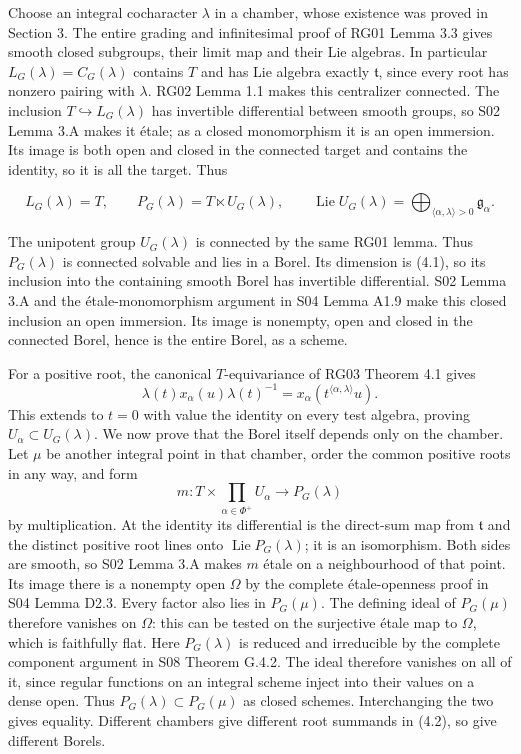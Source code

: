 \documentclass[11pt,a4paper,openany]{report}
\newcounter{none}
\begin{document}
Choose an integral cocharacter \(\lambda\) in a chamber, whose existence was proved in Section 3. The entire grading and infinitesimal proof of RG01 Lemma 3.3 gives smooth closed subgroups, their limit map and their Lie algebras. In particular \(L_G(\lambda)=C_G(\lambda)\) contains \(T\) and has Lie algebra exactly \(\mathfrak t\), since every root has nonzero pairing with \(\lambda\). RG02 Lemma 1.1 makes this centralizer connected. The inclusion \(T\hookrightarrow L_G(\lambda)\) has invertible differential between smooth groups, so S02 Lemma 3.A makes it étale; as a closed monomorphism it is an open immersion. Its image is both open and closed in the connected target and contains the identity, so it is all the target. Thus

\[
L_G(\lambda)=T,\qquad
P_G(\lambda)=T\ltimes U_G(\lambda),\qquad
\operatorname{Lie}U_G(\lambda)
=\bigoplus_{\langle\alpha,\lambda\rangle>0}\mathfrak g_\alpha.
\tag{4.2}
\]

The unipotent group \(U_G(\lambda)\) is connected by the same RG01 lemma. Thus \(P_G(\lambda)\) is connected solvable and lies in a Borel. Its dimension is (4.1), so its inclusion into the containing smooth Borel has invertible differential. S02 Lemma 3.A and the étale-monomorphism argument in S04 Lemma A1.9 make this closed inclusion an open immersion. Its image is nonempty, open and closed in the connected Borel, hence is the entire Borel, as a scheme.

For a positive root, the canonical \(T\)-equivariance of RG03 Theorem 4.1 gives \[
 \lambda(t)x_\alpha(u)\lambda(t)^{-1}
            =x_\alpha(t^{\langle\alpha,\lambda\rangle}u).
\] This extends to \(t=0\) with value the identity on every test algebra, proving \(U_\alpha\subset U_G(\lambda)\). We now prove that the Borel itself depends only on the chamber. Let \(\mu\) be another integral point in that chamber, order the common positive roots in any way, and form \[
 m:T\times\prod_{\alpha\in\Phi^+}U_\alpha
                        \longrightarrow P_G(\lambda)
\] by multiplication. At the identity its differential is the direct-sum map from \(\mathfrak t\) and the distinct positive root lines onto \(\operatorname{Lie}P_G(\lambda)\); it is an isomorphism. Both sides are smooth, so S02 Lemma 3.A makes \(m\) étale on a neighbourhood of that point. Its image there is a nonempty open \(\Omega\) by the complete étale-openness proof in S04 Lemma D2.3. Every factor also lies in \(P_G(\mu)\). The defining ideal of \(P_G(\mu)\) therefore vanishes on \(\Omega\): this can be tested on the surjective étale map to \(\Omega\), which is faithfully flat. Here \(P_G(\lambda)\) is reduced and irreducible by the complete component argument in S08 Theorem G.4.2. The ideal therefore vanishes on all of it, since regular functions on an integral scheme inject into their values on a dense open. Thus \(P_G(\lambda)\subset P_G(\mu)\) as closed schemes. Interchanging the two gives equality. Different chambers give different root summands in (4.2), so give different Borels.
\end{document}
